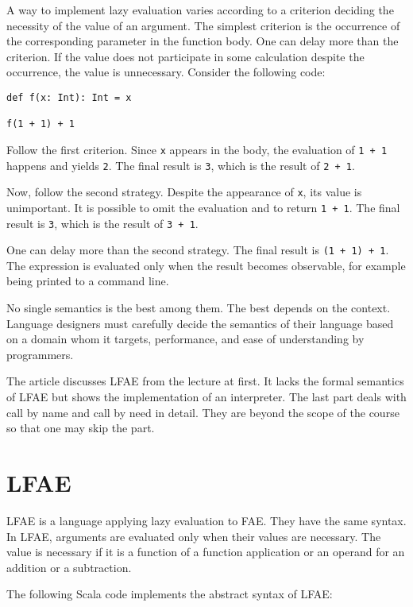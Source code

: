 A way to implement lazy evaluation varies according to a criterion deciding the
necessity of the value of an argument. The simplest criterion is the occurrence
of the corresponding parameter in the function body. One can delay more than the
criterion. If the value does not participate in some calculation despite the
occurrence, the value is unnecessary. Consider the following code:

\begin{verbatim}
def f(x: Int): Int = x

f(1 + 1) + 1
\end{verbatim}

Follow the first criterion. Since \verb!x! appears in the body, the evaluation of
\verb!1 + 1! happens and yields \verb!2!. The final result is \verb!3!, which is
the result of \verb!2 + 1!.

Now, follow the second strategy. Despite the appearance of \verb!x!, its value is
unimportant. It is possible to omit the evaluation and to return \verb!1 + 1!.
The final result is \verb!3!, which is the result of \verb!3 + 1!.

One can delay more than the second strategy. The final result is \verb!(1 + 1) + 1!.
The expression is evaluated only when the result becomes observable, for
example being printed to a command line.

No single semantics is the best among them. The best depends on the context.
Language designers must carefully decide the semantics of their language based on
a domain whom it targets, performance, and ease of understanding by programmers.

The article discusses LFAE from the lecture at first. It lacks the formal
semantics of LFAE but shows the implementation of an interpreter. The last part
deals with call by name and call by need in detail. They are beyond the scope of
the course so that one may skip the part.

\section{LFAE
}

LFAE is a language applying lazy evaluation to FAE. They have the same syntax. In
LFAE, arguments are evaluated only when their values are necessary. The value is
necessary if it is a function of a function application or an operand for an
addition or a subtraction.

The following Scala code implements the abstract syntax of LFAE:

